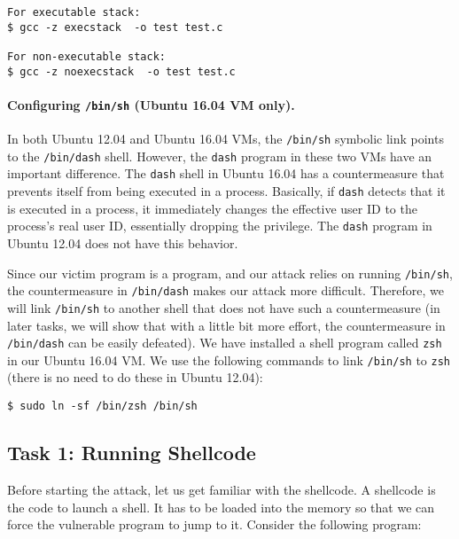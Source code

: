 \begin{lstlisting}
For executable stack:
$ gcc -z execstack  -o test test.c

For non-executable stack:
$ gcc -z noexecstack  -o test test.c
\end{lstlisting}



\paragraph{Configuring \texttt{/bin/sh} (Ubuntu 16.04 VM only).} In both Ubuntu 12.04 and 
Ubuntu 16.04 VMs, the \texttt{/bin/sh} symbolic link points to
the \texttt{/bin/dash} shell. However, the \texttt{dash} program 
in these two VMs have an important difference. 
The \texttt{dash} shell in Ubuntu 16.04 has a countermeasure
that prevents itself from being executed in a \setuid process. 
Basically, if \texttt{dash} detects that it is 
executed in a \setuid process, it immediately 
changes the effective user ID to the process's real user ID, essentially
dropping the privilege. The \texttt{dash} program in Ubuntu 12.04 does not have this 
behavior.    


Since our victim program is a \setuid program, and our 
attack relies on running \texttt{/bin/sh}, the countermeasure
in \texttt{/bin/dash} makes our attack more difficult. Therefore,
we will link \texttt{/bin/sh} to another shell that does not 
have such a countermeasure (in later tasks, we will show that with
a little bit more effort, the countermeasure in \texttt{/bin/dash}
can be easily defeated). We have installed a shell program 
called \texttt{zsh} in our Ubuntu 16.04 VM. We use the following
commands to link \texttt{/bin/sh} to \texttt{zsh} (there is no need to do these in Ubuntu
12.04):  


\begin{lstlisting}
$ sudo ln -sf /bin/zsh /bin/sh
\end{lstlisting}



\subsection{Task 1: Running Shellcode}


Before starting the attack, let us get familiar with the shellcode. A shellcode is the code to
launch a shell. It has to be loaded into the memory so that we can force the
vulnerable program to jump to it. Consider the following program:



